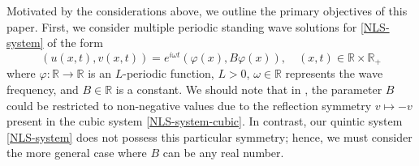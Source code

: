 \documentclass[10pt,reqno,a4paper]{amsart} %
\theoremstyle{definition} %
\numberwithin{equation}{section}
\numberwithin{figure}{section}
\begin{document}
Motivated by the considerations above, we outline the primary objectives of this paper. First, we consider multiple periodic standing wave solutions for \eqref{NLS-system} of the form
\begin{equation}\label{multiplesol}
    (u(x,t), v(x,t)) = e^{i\omega t}(\varphi(x), B \varphi(x)), \quad (x,t) \in \mathbb{R} \times \mathbb{R}_+
\end{equation}
where $\varphi: \mathbb{R} \rightarrow \mathbb{R}$ is an $L$-periodic function, $L>0$,  $\omega \in \mathbb{R}$ represents the wave frequency, and $B \in \mathbb{R}$ is a constant. We should note that in \cite{NataliBittencourt2024}, the parameter $B$ could be restricted to non-negative values due to the reflection symmetry $v \mapsto -v$ present in the cubic system \eqref{NLS-system-cubic}. In contrast, our quintic system \eqref{NLS-system} does not possess this particular symmetry; hence, we must consider the more general case where $B$ can be any real number.
\end{document}
